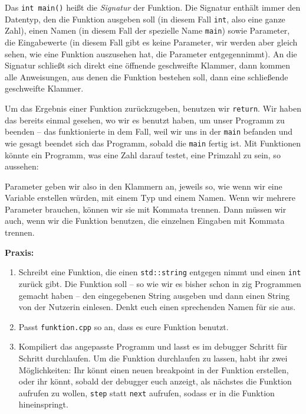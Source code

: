 Das \texttt{int main()} heißt die \emph{Signatur} der Funktion. Die Signatur
enthält immer den Datentyp, den die Funktion ausgeben soll (in diesem Fall
\texttt{int}, also eine ganze Zahl), einen Namen (in diesem Fall der spezielle
Name \texttt{main}) sowie Parameter, die Eingabewerte (in diesem Fall gibt es
keine Parameter, wir werden aber gleich sehen, wie eine Funktion auszusehen
hat, die Parameter entgegennimmt). An die Signatur schließt sich direkt eine
öffnende geschweifte Klammer, dann kommen alle Anweisungen, aus denen die
Funktion bestehen soll, dann eine schließende geschweifte Klammer.

Um das Ergebnis einer Funktion zurückzugeben, benutzen wir \texttt{return}. Wir
haben das bereits einmal gesehen, wo wir es benutzt haben, um unser Programm zu
beenden -- das funktionierte in dem Fall, weil wir uns in der \texttt{main}
befanden und wie gesagt beendet sich das Programm, sobald die \texttt{main}
fertig ist. Mit Funktionen könnte ein Programm, was eine Zahl darauf testet,
eine Primzahl zu sein, so aussehen:

Parameter geben wir also in den Klammern an, jeweils so, wie wenn wir eine
Variable erstellen würden, mit einem Typ und einem Namen. Wenn wir mehrere
Parameter brauchen, können wir sie mit Kommata trennen. Dann müssen wir auch,
wenn wir die Funktion benutzen, die einzelnen Eingaben mit Kommata trennen.

\textbf{Praxis:}
\begin{enumerate}
    \item Schreibt eine Funktion, die einen \texttt{std::string} entgegen nimmt
        und einen \texttt{int} zurück gibt. Die Funktion soll -- so wie wir es
        bisher schon in zig Programmen gemacht haben -- den eingegebenen String
        ausgeben und dann einen String von der Nutzerin einlesen. Denkt euch
        einen sprechenden Namen für sie aus.
    \item Passt \texttt{funktion.cpp} so an, dass es eure Funktion benutzt.
    \item Kompiliert das angepasste Programm und lasst es im debugger Schritt
        für Schritt durchlaufen. Um die Funktion durchlaufen zu lassen, habt
        ihr zwei Möglichkeiten: Ihr könnt einen neuen breakpoint in der
        Funktion erstellen, oder ihr könnt, sobald der debugger euch anzeigt,
        als nächstes die Funktion aufrufen zu wollen, \texttt{step} statt
        \texttt{next} aufrufen, sodass er in die Funktion hineinspringt.
\end{enumerate}

